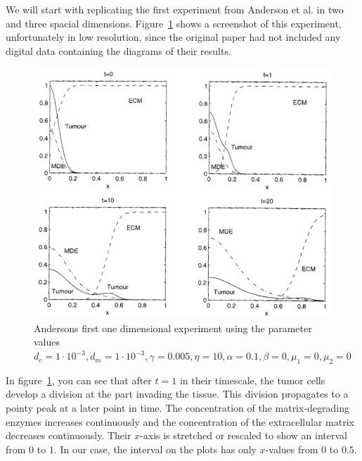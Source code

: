 We will start with replicating the first experiment from Anderson et al.\cite{anderson_mathematical_2000} in two and three spacial dimensions. Figure~\ref{fig:anderson_experiment} shows a screenshot of this experiment, unfortunately in low resolution, since the original paper had not included any digital data containing the diagrams of their results.
\begin{figure}[ht!]
 \centering
 \includegraphics[width=\textwidth]{resources/images/anderson_experiment.png}
 \caption{Andersons first one dimensional experiment using the parameter values $d_c = 1\cdot 10^{-3}, d_m = 1\cdot 10^{-3}, \gamma = 0.005, \eta = 10, \alpha = 0.1, \beta = 0, \mu_1 = 0, \mu_2 = 0$}
 \label{fig:anderson_experiment}
\end{figure}
In figure~\ref{fig:anderson_experiment}, you can see that after $t=1$ in their timescale, the tumor cells develop a division at the part invading the tissue. This division propagates to a pointy peak at a later point in time. The concentration of the matrix-degrading enzymes increases continuously and the concentration of the extracellular matrix decreases continuously. Their $x$-axis is stretched or rescaled to show an interval from $0$ to $1$. In our case, the interval on the plots has only $x$-values from $0$ to $0.5$.
